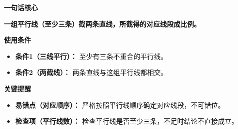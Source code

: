 \begin{summarybox}
	\textbf{\textcolor{CSummary}{一句话核心}}

	\textbf{一组平行线（至少三条）截两条直线，所截得的对应线段成比例。}

	\medskip
	\textbf{\textcolor{CSummary}{使用条件}}
	\begin{itemize}[leftmargin=*, itemsep=0.5em, topsep=0.4em]
		\item \textbf{条件1（三线平行）：} 至少有三条不重合的平行线。
		\item \textbf{条件2（两截线）：} 两条直线与这组平行线都相交。
	\end{itemize}

	\medskip
	\textbf{\textcolor{CSummary}{关键提醒}}
	\begin{itemize}[leftmargin=*, itemsep=0.5em, topsep=0.4em]
		\item \textbf{易错点（对应顺序）：} 严格按照平行线顺序确定对应线段，不可错位。
		\item \textbf{检查项（平行线数）：} 检查平行线是否至少三条，不足时结论不直接成立。
	\end{itemize}
\end{summarybox}
